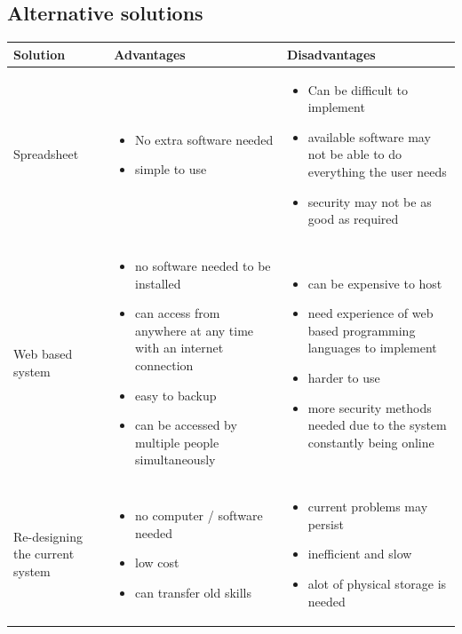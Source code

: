 \subsection{Alternative solutions}
\begin{center}
\begin{tabular}{|p{2cm}|p{4.5cm}|p{4.5cm}|}
	\hline
	\textbf{Solution} & \textbf{Advantages} & \textbf{Disadvantages} \\ \hline
	Spreadsheet & \begin{itemize} \item No extra software needed \item simple to use \end{itemize} & \begin{itemize} \item Can be difficult to implement \item available software may not be able to do everything the user needs \item security may not be as good as required \end{itemize} \\ \hline
	Web based system & \begin{itemize} \item no software needed to be installed \item can access from anywhere at any time with an internet connection \item easy to backup \item can be accessed by multiple people simultaneously \end{itemize} & \begin{itemize} \item can be expensive to host \item need experience of web based programming languages to implement \item harder to use \item more security methods needed due to the system constantly being online \end{itemize} \\ \hline
	Re-designing the current system & \begin{itemize} \item no computer / software needed \item low cost \item can transfer old skills \end{itemize} & \begin{itemize} \item current problems may persist \item inefficient and slow \item alot of physical storage is needed \end{itemize} \\ \hline

\end{tabular}
\end{center}
